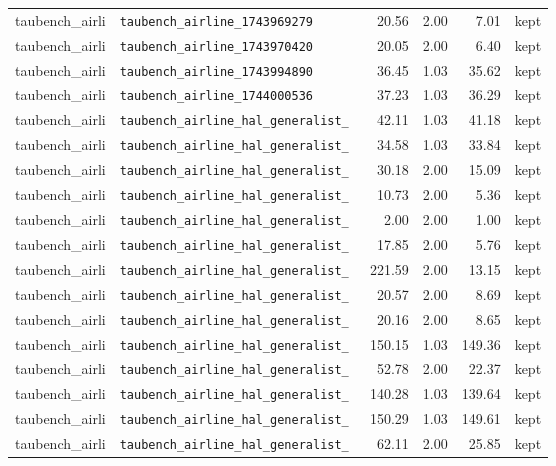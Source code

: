 {\begin{longtable}{llrrrl}
taubench\_airli & \texttt{\scriptsize taubench\_airline\_1743969279} & 20.56 & 2.00 & 7.01 & kept \\
taubench\_airli & \texttt{\scriptsize taubench\_airline\_1743970420} & 20.05 & 2.00 & 6.40 & kept \\
taubench\_airli & \texttt{\scriptsize taubench\_airline\_1743994890} & 36.45 & 1.03 & 35.62 & kept \\
taubench\_airli & \texttt{\scriptsize taubench\_airline\_1744000536} & 37.23 & 1.03 & 36.29 & kept \\
taubench\_airli & \texttt{\scriptsize taubench\_airline\_hal\_generalist\_~} & 42.11 & 1.03 & 41.18 & kept \\
taubench\_airli & \texttt{\scriptsize taubench\_airline\_hal\_generalist\_~} & 34.58 & 1.03 & 33.84 & kept \\
taubench\_airli & \texttt{\scriptsize taubench\_airline\_hal\_generalist\_~} & 30.18 & 2.00 & 15.09 & kept \\
taubench\_airli & \texttt{\scriptsize taubench\_airline\_hal\_generalist\_~} & 10.73 & 2.00 & 5.36 & kept \\
taubench\_airli & \texttt{\scriptsize taubench\_airline\_hal\_generalist\_~} & 2.00 & 2.00 & 1.00 & kept \\
taubench\_airli & \texttt{\scriptsize taubench\_airline\_hal\_generalist\_~} & 17.85 & 2.00 & 5.76 & kept \\
taubench\_airli & \texttt{\scriptsize taubench\_airline\_hal\_generalist\_~} & 221.59 & 2.00 & 13.15 & kept \\
taubench\_airli & \texttt{\scriptsize taubench\_airline\_hal\_generalist\_~} & 20.57 & 2.00 & 8.69 & kept \\
taubench\_airli & \texttt{\scriptsize taubench\_airline\_hal\_generalist\_~} & 20.16 & 2.00 & 8.65 & kept \\
taubench\_airli & \texttt{\scriptsize taubench\_airline\_hal\_generalist\_~} & 150.15 & 1.03 & 149.36 & kept \\
taubench\_airli & \texttt{\scriptsize taubench\_airline\_hal\_generalist\_~} & 52.78 & 2.00 & 22.37 & kept \\
taubench\_airli & \texttt{\scriptsize taubench\_airline\_hal\_generalist\_~} & 140.28 & 1.03 & 139.64 & kept \\
taubench\_airli & \texttt{\scriptsize taubench\_airline\_hal\_generalist\_~} & 150.29 & 1.03 & 149.61 & kept \\
taubench\_airli & \texttt{\scriptsize taubench\_airline\_hal\_generalist\_~} & 62.11 & 2.00 & 25.85 & kept \\

\end{longtable}}

